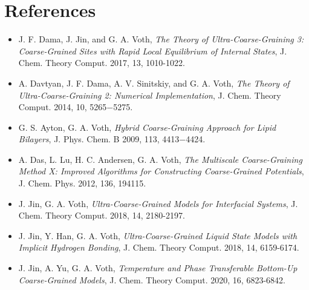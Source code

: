 \documentclass{article}
\begin{document}
\section{References}
\begin{itemize}
    \item J. F. Dama, J. Jin, and G. A. Voth, \textit{The Theory of Ultra-Coarse-Graining 3: Coarse-Grained Sites with Rapid Local Equilibrium of Internal States}, J. Chem. Theory Comput. 2017, 13, 1010-1022.
    \item A. Davtyan, J. F. Dama, A. V. Sinitskiy, and G. A. Voth, \textit{The Theory of Ultra-Coarse-Graining 2: Numerical Implementation}, J. Chem. Theory Comput. 2014, 10, 5265−5275.
    \item G. S. Ayton, G. A. Voth, \textit{Hybrid Coarse-Graining Approach for Lipid Bilayers}, J. Phys. Chem. B 2009, 113, 4413−4424.
    \item A. Das, L. Lu, H. C. Andersen, G. A. Voth, \textit{The Multiscale Coarse-Graining Method X: Improved Algorithms for Constructing Coarse-Grained Potentials}, J. Chem. Phys. 2012, 136, 194115.
    \item J. Jin, G. A. Voth, \textit{Ultra-Coarse-Grained Models for Interfacial Systems}, J. Chem. Theory Comput. 2018, 14, 2180-2197.
    \item J. Jin, Y. Han, G. A. Voth, \textit{Ultra-Coarse-Grained Liquid State Models with Implicit Hydrogen Bonding}, J. Chem. Theory Comput. 2018, 14, 6159-6174.
    \item J. Jin, A. Yu, G. A. Voth, \textit{Temperature and Phase Transferable Bottom-Up Coarse-Grained Models}, J. Chem. Theory Comput. 2020, 16, 6823-6842.
\end{itemize}
\end{document}
